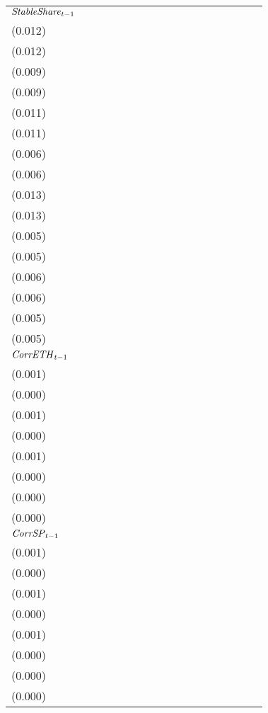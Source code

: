 \begin{tabular}{lllllllllllllllll}
${{\it StableShare}}_{t-1}$  &   \makecell{$0.671^{**}$ \\(0.012)} &   \makecell{$0.673^{**}$ \\(0.012)} &   \makecell{$0.169^{**}$ \\(0.009)} &   \makecell{$0.169^{**}$ \\(0.009)} &  \makecell{$-0.040^{**}$ \\(0.011)} &  \makecell{$-0.041^{**}$ \\(0.011)} &    \makecell{$-0.007^{}$ \\(0.006)} &    \makecell{$-0.007^{}$ \\(0.006)} &   \makecell{$-0.032^{*}$ \\(0.013)} &  \makecell{$-0.033^{**}$ \\(0.013)} &   \makecell{$-0.002^{}$ \\(0.005)} &   \makecell{$-0.002^{}$ \\(0.005)} &   \makecell{$0.448^{**}$ \\(0.006)} &  \makecell{$0.448^{**}$ \\(0.006)} &  \makecell{$0.117^{**}$ \\(0.005)} &  \makecell{$0.117^{**}$ \\(0.005)} \\
${{\it CorrETH}}_{t-1}$      &     \makecell{$0.001^{}$ \\(0.001)} &                                     &    \makecell{$0.001^{*}$ \\(0.000)} &                                     &   \makecell{$0.004^{**}$ \\(0.001)} &                                     &    \makecell{$0.001^{*}$ \\(0.000)} &                                     &   \makecell{$0.004^{**}$ \\(0.001)} &                                     &    \makecell{$0.000^{}$ \\(0.000)} &                                    &  \makecell{$-0.001^{**}$ \\(0.000)} &                                    &   \makecell{$-0.000^{}$ \\(0.000)} &                                    \\
${{\it CorrSP}}_{t-1}$       &                                     &  \makecell{$-0.002^{**}$ \\(0.001)} &                                     &    \makecell{$-0.000^{}$ \\(0.000)} &                                     &   \makecell{$0.002^{**}$ \\(0.001)} &                                     &     \makecell{$0.000^{}$ \\(0.000)} &                                     &     \makecell{$0.001^{}$ \\(0.001)} &                                    &    \makecell{$0.000^{}$ \\(0.000)} &                                     &   \makecell{$-0.000^{}$ \\(0.000)} &                                    &   \makecell{$-0.000^{}$ \\(0.000)} \\

\end{tabular}
